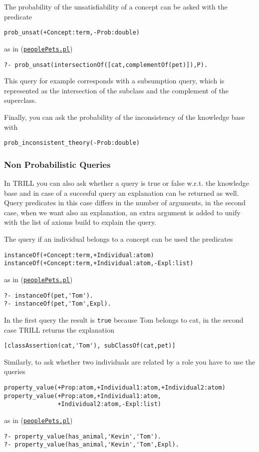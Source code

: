 The probability of the unsatisfiability of a concept can be asked with the predicate
\begin{verbatim}
prob_unsat(+Concept:term,-Prob:double)
\end{verbatim}
as in (\href{http://trill-sw.eu/example/trill/peoplePets.pl}{\texttt{peoplePets.pl}})
\begin{verbatim}
?- prob_unsat(intersectionOf([cat,complementOf(pet)]),P).
\end{verbatim}
This query for example corresponds with a subsumption query, which is represented as the intersection of the subclass and the complement of the superclass.

Finally, you can ask the probability of the inconsistency of the knowledge base with
\begin{verbatim}
prob_inconsistent_theory(-Prob:double)
\end{verbatim}


\subsubsection{Non Probabilistic Queries}
In TRILL you can also ask whether a query is true or false w.r.t. the knowledge base and in case of a succesful query an explanation can be returned as well. 
Query predicates in this case differs in the number of arguments, in the second case, when we want also an explanation, an extra argument is added to unify with the list of axioms
build to explain the query.

The query if an individual belongs to a concept can be used the predicates
\begin{verbatim}
instanceOf(+Concept:term,+Individual:atom)
instanceOf(+Concept:term,+Individual:atom,-Expl:list)
\end{verbatim}
as in (\href{http://trill-sw.eu/example/trill/peoplePets.pl}{\texttt{peoplePets.pl}})
\begin{verbatim}
?- instanceOf(pet,'Tom').
?- instanceOf(pet,'Tom',Expl).
\end{verbatim}
In the first query the result is \verb|true| because Tom belongs to cat, in the second case TRILL returns the explanation 
\begin{verbatim}
[classAssertion(cat,'Tom'), subClassOf(cat,pet)]
\end{verbatim}


Similarly, to ask whether two individuals are related by a role you have to use the queries
\begin{verbatim}
property_value(+Prop:atom,+Individual1:atom,+Individual2:atom)
property_value(+Prop:atom,+Individual1:atom,
               +Individual2:atom,-Expl:list)
\end{verbatim}
as in (\href{http://trill-sw.eu/example/trill/peoplePets.pl}{\texttt{peoplePets.pl}})
\begin{verbatim}
?- property_value(has_animal,'Kevin','Tom').
?- property_value(has_animal,'Kevin','Tom',Expl).
\end{verbatim}

